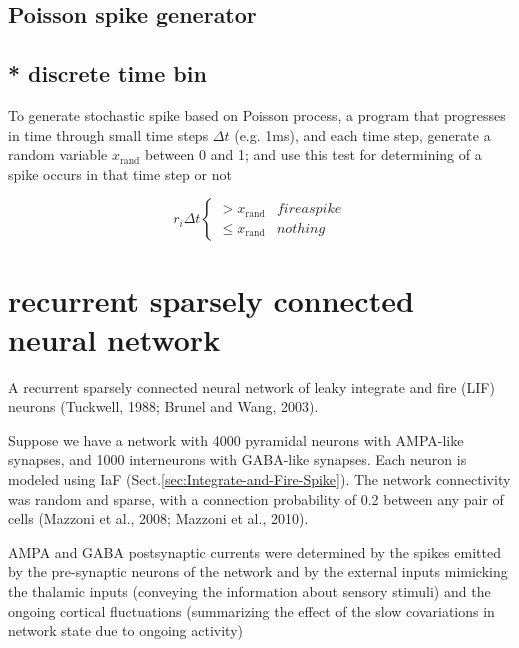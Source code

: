 \subsection{Poisson spike generator}

\def\rand{{\text{rand}}}


\subsection{ * discrete time bin}

To generate stochastic spike based on Poisson process, a program that progresses 
in time through small time steps $\Delta t$ (e.g. 1ms), and each time step,
generate a random variable $x_\rand$ between 0 and 1; and use this test for determining of
a spike occurs in that time step or not

\begin{equation}
r_i \Delta t \left\{ 
\begin{array}{cc}
> x_\rand & fire a spike \\
\le x_\rand & nothing
\end{array} 
\right.
\end{equation}

\section{recurrent sparsely connected neural network}
\label{sec:cortical-network-AMPA-GABA}

A recurrent sparsely connected neural network of leaky integrate and fire
(LIF) neurons (Tuckwell, 1988; Brunel and Wang, 2003). 

Suppose we have a network with 4000 pyramidal neurons with AMPA-like synapses,
and 1000 interneurons with GABA-like synapses. Each neuron is modeled using IaF
(Sect.\ref{sec:Integrate-and-Fire-Spike}). The network connectivity was random
and sparse, with a connection probability of 0.2 between any pair of cells
(Mazzoni et al., 2008; Mazzoni et al., 2010).

AMPA and GABA postsynaptic currents were determined by the spikes emitted by the
pre-synaptic neurons of the network and by the external inputs mimicking the
thalamic inputs (conveying the information about sensory stimuli) and the
ongoing cortical fluctuations (summarizing the effect of the slow covariations
in network state due to ongoing activity)
